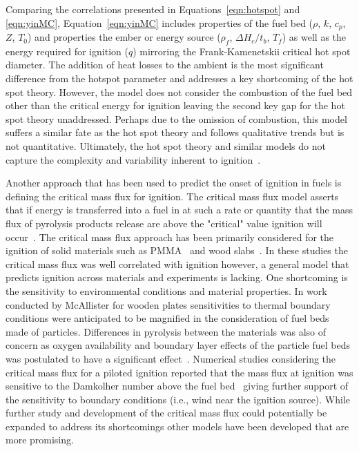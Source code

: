     Comparing the correlations presented in Equations~\ref{eqn:hotspot} and \ref{eqn:yinMC}, Equation~\ref{eqn:yinMC} includes properties of the fuel bed ($\rho$, $k$, $c_p$, $Z$, $T_0$) and properties the ember or energy source ($\rho_f$, $\Delta H_c/t_b$, $T_f$) as well as the energy required for ignition ($q$) mirroring the Frank-Kamenetskii critical hot spot diameter. The addition of heat losses to the ambient is the most significant difference from the hotspot parameter and addresses a key shortcoming of the hot spot theory. However, the model does not consider the combustion of the fuel bed other than the critical energy for ignition leaving the second key gap for the hot spot theory unaddressed. Perhaps due to the omission of combustion, this model suffers a similar fate as the hot spot theory and follows qualitative trends but is not quantitative. Ultimately, the hot spot theory and similar models do not capture the complexity and variability inherent to ignition~\cite{Manzello2020}. 
    
    
    Another approach that has been used to predict the onset of ignition in fuels is defining the critical mass flux for ignition. The critical mass flux model asserts that if energy is transferred into a fuel in at such a rate or quantity that the mass flux of pyrolysis products release are above the "critical" value ignition will occur~\cite{Nelson1995}. The critical mass flux approach has been primarily considered for the ignition of solid materials such as PMMA~\cite{Rich2007} and wood slabs~\cite{Yashwanth2015, McAllister2013}. In these studies the critical mass flux was well correlated with ignition however, a general model that predicts ignition across materials and experiments is lacking. One shortcoming is the sensitivity to environmental conditions and material properties. In work conducted by McAllister for wooden plates sensitivities to thermal boundary conditions were anticipated to be magnified in the consideration of fuel beds made of particles. Differences in pyrolysis between the materials was also of concern as oxygen availability and boundary layer effects of the particle fuel beds was postulated to have a significant effect~\cite{McAllister2013}.  Numerical studies considering the critical mass flux for a piloted ignition reported that the mass flux at ignition was sensitive to the Damkolher number above the fuel bed~\cite{Dai2013} giving further support of the sensitivity to boundary conditions (i.e., wind near the ignition source). While further study and development of the critical mass flux could potentially be expanded to address its shortcomings other models have been developed that are more promising.
    
